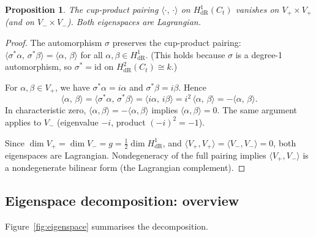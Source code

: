 \documentclass[11pt]{article}
\theoremstyle{plain}
\newtheorem{proposition}[theorem]{Proposition}
\theoremstyle{definition}
\theoremstyle{remark}
\newcommand{\HdR}{H^1_{\mathrm{dR}}}
\begin{document}
\begin{proposition}\label{prop:lagrangian}
The cup-product pairing $\langle\cdot,\,\cdot\rangle$ on $\HdR(C_t)$
vanishes on $V_+ \times V_+$ (and on $V_- \times V_-$).  Both
eigenspaces are Lagrangian.
\end{proposition}

\begin{proof}
The automorphism $\sigma$ preserves the cup-product pairing:
$\langle\sigma^*\alpha,\, \sigma^*\beta\rangle =
\langle\alpha,\, \beta\rangle$ for all $\alpha, \beta \in \HdR$.
(This holds because $\sigma$ is a degree-1 automorphism, so
$\sigma^* = \mathrm{id}$ on $H^2_{\mathrm{dR}}(C_t) \cong k$.)

For $\alpha, \beta \in V_+$, we have
$\sigma^*\alpha = i\alpha$ and $\sigma^*\beta = i\beta$.  Hence
\[
  \langle\alpha,\, \beta\rangle
  = \langle\sigma^*\alpha,\, \sigma^*\beta\rangle
  = \langle i\alpha,\, i\beta\rangle
  = i^2\,\langle\alpha,\, \beta\rangle
  = -\langle\alpha,\, \beta\rangle.
\]
In characteristic zero, $\langle\alpha,\beta\rangle =
-\langle\alpha,\beta\rangle$ implies
$\langle\alpha,\beta\rangle = 0$.  The same argument applies to $V_-$
(eigenvalue $-i$, product $(-i)^2 = -1$).

Since $\dim V_+ = \dim V_- = g = \tfrac{1}{2}\dim\HdR$, and
$\langle V_+, V_+\rangle = \langle V_-, V_-\rangle = 0$, both
eigenspaces are Lagrangian.  Nondegeneracy of the full pairing
implies $\langle V_+, V_-\rangle$ is a nondegenerate bilinear form
(the Lagrangian complement).
\end{proof}

\subsection{Eigenspace decomposition: overview}

Figure~\ref{fig:eigenspace} summarises the decomposition.
\end{document}
